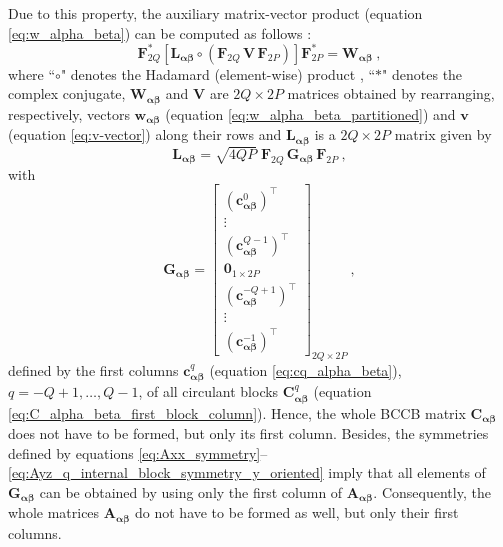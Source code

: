 \documentclass[manuscript]{geophysics}
\begin{document}
Due to this property, the auxiliary matrix-vector product (equation \ref{eq:w_alpha_beta}) 
can be computed as follows \citep{takahashi2020convolutional}:
\begin{equation}
	\mathbf{F}_{2Q}^{\ast} \left[ 
	\mathbf{L}_{\boldsymbol{\alpha\beta}} \circ \left(\mathbf{F}_{2Q} \, \mathbf{V} \, \mathbf{F}_{2P} \right) 
	\right] \mathbf{F}_{2P}^{\ast} = \mathbf{W}_{\boldsymbol{\alpha\beta}} \: ,
	\label{eq:2d-discrete-convolution}
\end{equation}
where ``$\circ$" denotes the Hadamard (element-wise) product \citep[e.g.,][ p. 298]{horn_johnson1991},
``$\ast$" denotes the complex conjugate, 
$\mathbf{W}_{\boldsymbol{\alpha\beta}}$ and $\mathbf{V}$ are $2Q \times 2P$ matrices obtained
by rearranging, respectively, vectors $\mathbf{w}_{\boldsymbol{\alpha\beta}}$ 
(equation \ref{eq:w_alpha_beta_partitioned}) and $\mathbf{v}$ (equation \ref{eq:v-vector})
along their rows and $\mathbf{L}_{\boldsymbol{\alpha\beta}}$ is a $2Q \times 2P$ matrix
given by
\begin{equation}
	\mathbf{L}_{\boldsymbol{\alpha\beta}} = \sqrt{4QP} \; 
	\mathbf{F}_{2Q} \, \mathbf{G}_{\boldsymbol{\alpha\beta}} \, \mathbf{F}_{2P} \: ,
	\label{eq:L_alpha_beta}
\end{equation}
with
\begin{equation}
	\mathbf{G}_{\boldsymbol{\alpha\beta}} = \begin{bmatrix}
		\left( \mathbf{c}_{\boldsymbol{\alpha\beta}}^{0} \right)^{\top} \\
		\vdots \\
		\left( \mathbf{c}_{\boldsymbol{\alpha\beta}}^{Q-1} \right)^{\top} \\
		\mathbf{0}_{1 \times 2P} \\
		\left( \mathbf{c}_{\boldsymbol{\alpha\beta}}^{-Q+1} \right)^{\top} \\
		\vdots \\
		\left( \mathbf{c}_{\boldsymbol{\alpha\beta}}^{-1} \right)^{\top}
	\end{bmatrix}_{2Q \times 2P} \: ,
	\label{eq:G_alpha_beta}
\end{equation}
defined by the first columns $\mathbf{c}_{\boldsymbol{\alpha\beta}}^{q}$ 
(equation \ref{eq:cq_alpha_beta}), $q = -Q+1, \dots, Q-1$, of all circulant blocks
$\mathbf{C}_{\boldsymbol{\alpha\beta}}^{q}$ (equation \ref{eq:C_alpha_beta_first_block_column}).
Hence, the whole BCCB matrix $\mathbf{C}_{\boldsymbol{\alpha\beta}}$ does not have to be
formed, but only its first column. 
Besides, the symmetries defined by equations 
\ref{eq:Axx_symmetry}--\ref{eq:Ayz_q_internal_block_symmetry_y_oriented} imply
that all elements of $\mathbf{G}_{\boldsymbol{\alpha\beta}}$ can be obtained by 
using only the first column of $\mathbf{A_{\boldsymbol{\alpha\beta}}}$. Consequently, 
the whole matrices $\mathbf{A_{\boldsymbol{\alpha\beta}}}$ do not have to be formed
as well, but only their first columns.
\end{document}

